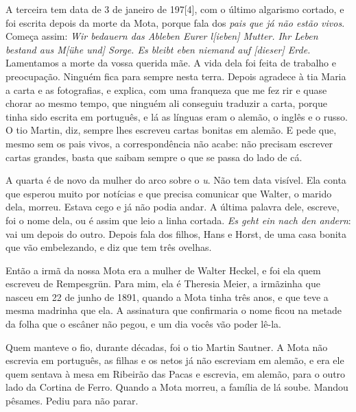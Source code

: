 \documentclass[
  brazilian,
  11pt,
  openany]{book}
\begin{document}
A terceira tem data de 3 de janeiro de 197{[}4{]}, com o último
algarismo cortado, e foi escrita depois da morte da Mota, porque fala
dos \emph{pais que já não estão vivos}. Começa assim: \emph{Wir bedauern
das Ableben Eurer l{[}ieben{]} Mutter. Ihr Leben bestand aus M{[}ühe
und{]} Sorge. Es bleibt eben niemand auf {[}dieser{]} Erde.} Lamentamos
a morte da vossa querida mãe. A vida dela foi feita de trabalho e
preocupação. Ninguém fica para sempre nesta terra. Depois agradece à tia
Maria a carta e as fotografias, e explica, com uma franqueza que me fez
rir e quase chorar ao mesmo tempo, que ninguém ali conseguiu traduzir a
carta, porque tinha sido escrita em português, e lá as línguas eram o
alemão, o inglês e o russo. O tio Martin, diz, sempre lhes escreveu
cartas bonitas em alemão. E pede que, mesmo sem os pais vivos, a
correspondência não acabe: não precisam escrever cartas grandes, basta
que saibam sempre o que se passa do lado de cá.

A quarta é de novo da mulher do arco sobre o \emph{u}. Não tem data
visível. Ela conta que esperou muito por notícias e que precisa
comunicar que Walter, o marido dela, morreu. Estava cego e já não podia
andar. A última palavra dele, escreve, foi o nome dela, ou é assim que
leio a linha cortada. \emph{Es geht ein nach den andern}: vai um depois
do outro. Depois fala dos filhos, Hans e Horst, de uma casa bonita que
vão embelezando, e diz que tem três ovelhas.

Então a irmã da nossa Mota era a mulher de Walter Heckel, e foi ela quem
escreveu de Rempesgrün. Para mim, ela é Theresia Meier, a irmãzinha que
nasceu em 22 de junho de 1891, quando a Mota tinha três anos, e que teve
a mesma madrinha que ela. A assinatura que confirmaria o nome ficou na
metade da folha que o escâner não pegou, e um dia vocês vão poder lê-la.

Quem manteve o fio, durante décadas, foi o tio Martin Sautner. A Mota
não escrevia em português, as filhas e os netos já não escreviam em
alemão, e era ele quem sentava à mesa em Ribeirão das Pacas e escrevia,
em alemão, para o outro lado da Cortina de Ferro. Quando a Mota morreu,
a família de lá soube. Mandou pêsames. Pediu para não parar.
\end{document}
